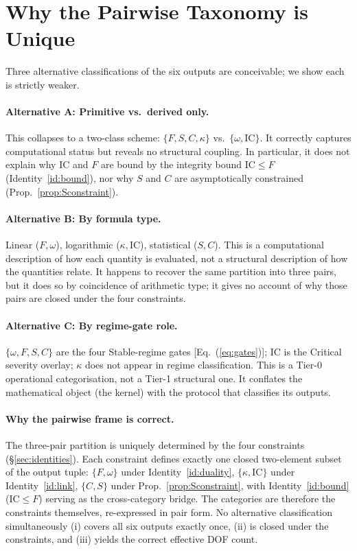 \documentclass[
  aps,
  prd,
  twocolumn,
  superscriptaddress,
  nofootinbib,
  floatfix
]{revtex4-2}
\newcommand{\IC}{\mathrm{IC}}
\begin{document}
\section{Why the Pairwise Taxonomy is Unique}\label{sec:alternatives}

Three alternative classifications of the six outputs are
conceivable; we show each is strictly weaker.

\paragraph*{Alternative A: Primitive vs.\ derived only.}
This collapses to a two-class scheme:
$\{F,S,C,\kappa\}$ vs.\ $\{\omega,\IC\}$.  It correctly captures
computational status but reveals no structural coupling.  In
particular, it does not explain why $\IC$ and $F$ are bound by
the integrity bound $\IC\le F$ (Identity~\ref{id:bound}), nor
why $S$ and $C$ are asymptotically constrained
(Prop.~\ref{prop:Sconstraint}).

\paragraph*{Alternative B: By formula type.}
Linear ($F,\omega$), logarithmic ($\kappa,\IC$), statistical
($S,C$).  This is a computational description of how each
quantity is evaluated, not a structural description of how the
quantities relate.  It happens to recover the same partition
into three pairs, but it does so by coincidence of arithmetic
type; it gives no account of why those pairs are closed under
the four constraints.

\paragraph*{Alternative C: By regime-gate role.}
$\{\omega,F,S,C\}$ are the four Stable-regime gates
[Eq.~(\ref{eq:gates})]; $\IC$ is the Critical severity overlay;
$\kappa$ does not appear in regime classification.  This is a
Tier-0 operational categorisation, not a Tier-1 structural one.
It conflates the mathematical object (the kernel) with the
protocol that classifies its outputs.

\paragraph*{Why the pairwise frame is correct.}
The three-pair partition is uniquely determined by the four
constraints (\S\ref{sec:identities}).  Each constraint defines
exactly one closed two-element subset of the output tuple:
$\{F,\omega\}$ under Identity~\ref{id:duality},
$\{\kappa,\IC\}$ under Identity~\ref{id:link},
$\{C,S\}$ under Prop.~\ref{prop:Sconstraint}, with
Identity~\ref{id:bound} ($\IC\le F$) serving as the
cross-category bridge.  The categories are therefore the
constraints themselves, re-expressed in pair form.  No alternative
classification simultaneously (i) covers all six outputs exactly
once, (ii) is closed under the constraints, and (iii) yields the
correct effective DOF count.
\end{document}
